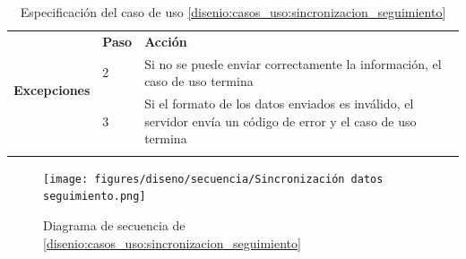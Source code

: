 \begin{table}[h]
\begin{tabularx}{\textwidth}{|l|l|X|}
                    \multirow{3}{*}{\textbf{Excepciones}}  & \textbf{Paso} & \textbf{Acción} \\
                    \cline{2-3} & 2 & Si no se puede enviar correctamente la información, el caso de uso termina \\
                    \cline{2-3} & 3 & Si el formato de los datos enviados es inválido, el servidor envía un código de error y el caso de uso termina \\
                    \hline
                    \caption{Especificación del caso de uso \ref{disenio:casos_uso:sincronizacion_seguimiento}}
                    \label{tabla:casos_uso:sincronizacion_seguimiento}
                \end{tabularx}
            \end{table}

            \begin{figure}[h]
                \centering
                \texttt{[image: figures/diseno/secuencia/Sincronización datos seguimiento.png]}
                \caption{Diagrama de secuencia de \ref{disenio:casos_uso:sincronizacion_seguimiento}}
                \label{figure:diagrama_secuencia:sincronizacion_seguimiento}
            \end{figure}

